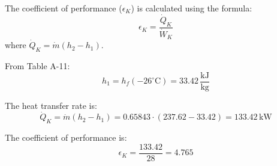 The coefficient of performance (\( \epsilon_K \)) is calculated using the formula:  
\[
\epsilon_K = \frac{\dot{Q}_K}{\dot{W}_K}
\]  
where \( \dot{Q}_K = \dot{m} (h_2 - h_1) \).  

From Table A-11:  
\[
h_1 = h_f(-26^\circ\text{C}) = 33.42 \, \frac{\text{kJ}}{\text{kg}}
\]  

The heat transfer rate is:  
\[
\dot{Q}_K = \dot{m} (h_2 - h_1) = 0.65843 \cdot (237.62 - 33.42) = 133.42 \, \text{kW}
\]  

The coefficient of performance is:  
\[
\epsilon_K = \frac{133.42}{28} = 4.765
\]